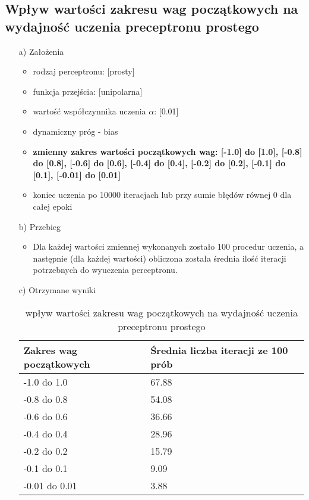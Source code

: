 \documentclass[17pt]{article}
\begin{document}
\subsection{Wpływ wartości zakresu wag początkowych na wydajność uczenia preceptronu prostego}
\vspace{4mm}
\begin{enumerate}

\item[a)] Założenia

\begin{itemize}
\item rodzaj perceptronu: [prosty]
\item funkcja przejścia: [unipolarna]
\item wartość współczynnika uczenia $\alpha$: [0.01]
\item dynamiczny próg - bias
\item \textbf{zmienny zakres wartości początkowych wag: [-1.0] do [1.0], [-0.8] do [0.8], [-0.6] do [0.6], [-0.4] do [0.4], [-0.2] do [0.2], [-0.1] do [0.1], [-0.01] do [0.01]}
\item koniec uczenia po 10000 iteracjach lub przy sumie błędów równej 0 dla całej epoki
\end{itemize}

\item[b)] Przebieg

\begin{itemize}
\item Dla każdej wartości zmiennej wykonanych zostało 100 procedur uczenia, a następnie (dla każdej wartości) obliczona została średnia ilość iteracji potrzebnych do wyuczenia perceptronu.
\end{itemize}
\item[c)] Otrzymane wyniki

\begin{table}[ht]
\centering
\begin{tabular}{|p{4cm}|p{4cm}|}
 \hline
 Zakres wag początkowych & Średnia liczba iteracji ze 100 prób\\ \hline
 -1.0 do 1.0 & 67.88\\ 
 -0.8 do 0.8 & 54.08\\ 
 -0.6 do 0.6 & 36.66\\ 
 -0.4 do 0.4 & 28.96\\ 
 -0.2 do 0.2 & 15.79\\ 
 -0.1 do 0.1 & 9.09\\ 
 -0.01 do 0.01 & 3.88\\ 
 \hline
\end{tabular}
\caption{\label{tab:table2}wpływ wartości zakresu wag początkowych na wydajność uczenia preceptronu prostego}
\end{table}


\end{enumerate}
\end{document}
